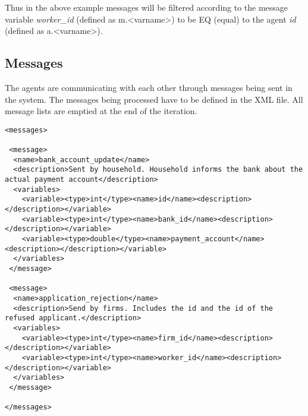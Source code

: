 Thus in the above example messages will be filtered according to the
message variable \emph{worker\_id} (defined as m.<varname>) to be EQ
(equal) to the agent \emph{id} (defined as a.<varname>).

\subsection{Messages}
The agents are communicating with each other through messages being
sent in the system. The messages being processed have to be defined
in the XML file. All message lists are emptied at the end of the
iteration.

\begin{mylisting}
\begin{verbatim}
<messages>

 <message>
  <name>bank_account_update</name>
  <description>Sent by household. Household informs the bank about the actual payment account</description>
  <variables>
    <variable><type>int</type><name>id</name><description></description></variable>
    <variable><type>int</type><name>bank_id</name><description></description></variable>
    <variable><type>double</type><name>payment_account</name><description></description></variable>
  </variables>
 </message>

 <message>
  <name>application_rejection</name>
  <description>Send by firms. Includes the id and the id of the refused applicant.</description>
  <variables>
    <variable><type>int</type><name>firm_id</name><description></description></variable>
    <variable><type>int</type><name>worker_id</name><description></description></variable>
  </variables>
 </message>

</messages>
\end{verbatim}
\end{mylisting}
